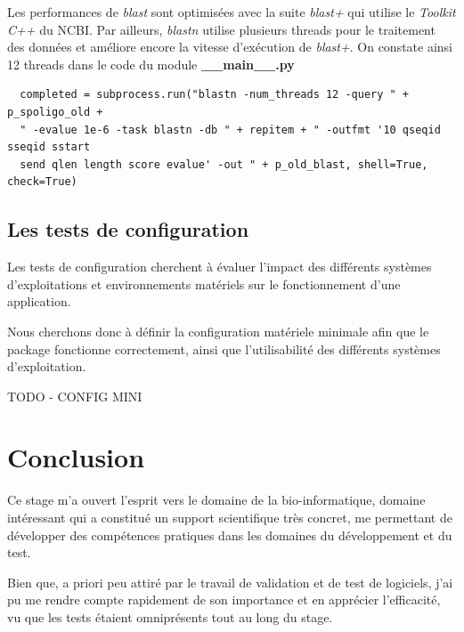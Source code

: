 \documentclass[twoside,a4paper,11pt,frenchb,openany]{report}
\begin{document}
Les performances de \textit{blast} sont optimisées avec la suite \textit{blast+} qui utilise le \textit{Toolkit C++} du NCBI. Par ailleurs, \textit{blastn} utilise plusieurs threads pour le traitement des données et améliore encore la vitesse d'exécution de \textit{blast+}. On constate ainsi 12 threads dans le code du module \textbf{\_\_main\_\_.py}

\begin{verbatim}
  completed = subprocess.run("blastn -num_threads 12 -query " + p_spoligo_old + 
  " -evalue 1e-6 -task blastn -db " + repitem + " -outfmt '10 qseqid sseqid sstart 
  send qlen length score evalue' -out " + p_old_blast, shell=True, check=True)
\end{verbatim}







\section{Les tests de configuration}

Les tests de configuration cherchent à évaluer l'impact des différents systèmes d'exploitations et environnements matériels sur le fonctionnement d'une application.

Nous cherchons donc à définir la configuration matériele minimale afin que le package fonctionne correctement, ainsi que l'utilisabilité des différents systèmes d'exploitation.

TODO - CONFIG MINI






\chapter{Conclusion}

Ce stage m'a ouvert l'esprit vers le domaine de la bio-informatique, domaine intéressant qui a constitué un support scientifique très concret, me permettant de développer des compétences pratiques dans les domaines du développement et du test. 

Bien que, a priori peu attiré par le travail de validation et de test de logiciels, j'ai pu me rendre compte rapidement de son importance et en apprécier l'efficacité, vu que les tests étaient omniprésents tout au long du stage.   
\end{document}
